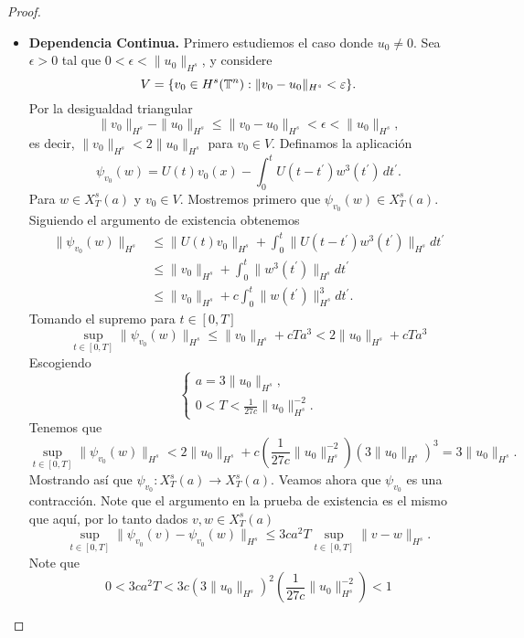 \begin{proof}
\begin{itemize}
       \item \textbf{Dependencia Continua.} Primero estudiemos el caso donde $u_0\neq0.$ Sea $\epsilon>0$ tal que $0<\epsilon<\|u_0\|_{H^s}$, y considere 
       $$V=\{v_0\in H^s(\mathbb{T}^n):\|v_0-u_0\|_{H^s}<\varepsilon\}.$$
       Por la desigualdad triangular
       $$\|v_0\|_{H^s}-\|u_0\|_{H^s}\leq\|v_0-u_0\|_{H^s}<\epsilon<\|u_0\|_{H^s},$$
       es decir, $\|v_0\|_{H^s}<2\|u_0\|_{H^s}$ para $v_0\in V.$ Definamos la aplicación
       $$\psi_{v_0}(w)=U(t)v_0(x)-\int_0^tU(t-t^\prime)w^3(t^\prime)\,dt^\prime.$$
       Para $w\in X^s_T(a)$ y $v_0\in V.$ Mostremos primero que $\psi_{v_0}(w)\in X^s_T(a).$ Siguiendo el argumento de existencia obtenemos
       \begin{align*}
           \|\psi_{v_0}(w)\|_{H^s}&\leq\|U(t)v_0\|_{H^s}+\int_0^t\|U(t-t^\prime)w^3(t^\prime)\|_{H^s}dt^\prime\\
           &\leq\|v_0\|_{H^s}+\int_0^t\|w^3(t^\prime)\|_{H^s}dt^\prime\\
           &\leq\|v_0\|_{H^s}+c\int_0^t\|w(t^\prime)\|_{H^s}^3dt^\prime.
       \end{align*}
       Tomando el supremo para $t\in[0,T]$
       $$\sup_{t\in[0,T]} \|\psi_{v_0}(w)\|_{H^s}\leq \|v_0\|_{H^s}+cTa^3<2\|u_0\|_{H^s}+cTa^3$$
       Escogiendo
       $$\begin{cases}
           a=3\|u_0\|_{H^s},\\
           0<T<\frac{1}{27c}\|u_0\|_{H^s}^{-2}.
       \end{cases}$$
       Tenemos que
       $$\sup_{t\in[0,T]} \|\psi_{v_0}(w)\|_{H^s}<2\|u_0\|_{H^s}+c\left(\frac{1}{27c}\|u_0\|_{H^s}^{-2}\right)(3\|u_0\|_{H^s})^3=3\|u_0\|_{H^s}.$$
       Mostrando así que $\psi_{v_0}:X^s_T(a)\to X^s_T(a).$ Veamos ahora que $\psi_{v_0}$ es una contracción. Note que el argumento en la prueba de existencia es el mismo que aquí, por lo tanto dados $v,w\in X^s_T(a)$
       $$\sup_{t\in[0,T]}\|\psi_{v_0}(v)-\psi_{v_0}(w)\|_{H^s}\leq 3ca^2T\sup_{t\in[0,T]}\|v-w\|_{H^s}.$$
       Note que
       $$0<3ca^2T<3c(3\|u_0\|_{H^s})^2\left(\frac{1}{27c}\|u_0\|_{H^s}^{-2}\right)<1$$

       


   \end{itemize}   
\end{proof}


